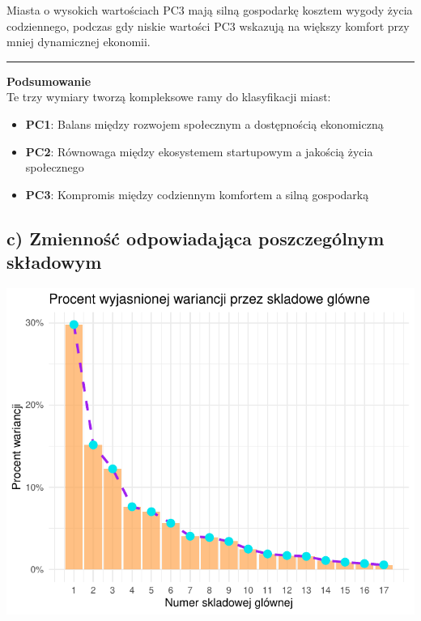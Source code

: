 \documentclass[
  12pt,
]{article}
\providecommand{\tightlist}{%
  \setlength{\itemsep}{0pt}\setlength{\parskip}{0pt}}
\begin{document}
Miasta o wysokich wartościach PC3 mają silną gospodarkę kosztem wygody
życia codziennego, podczas gdy niskie wartości PC3 wskazują na większy
komfort przy mniej dynamicznej ekonomii.

\begin{center}\rule{0.5\linewidth}{0.5pt}\end{center}

\textbf{Podsumowanie}\\
Te trzy wymiary tworzą kompleksowe ramy do klasyfikacji miast:

\begin{itemize}
\tightlist
\item
  \textbf{PC1}: Balans między rozwojem społecznym a dostępnością
  ekonomiczną\\
\item
  \textbf{PC2}: Równowaga między ekosystemem startupowym a jakością
  życia społecznego\\
\item
  \textbf{PC3}: Kompromis między codziennym komfortem a silną gospodarką
\end{itemize}

\subsection{c) Zmienność odpowiadająca poszczególnym
składowym}\label{c-zmiennoux15bux107-odpowiadajux105ca-poszczeguxf3lnym-skux142adowym}

\begin{center}\includegraphics{Sprawozdanie2_files/figure-latex/Zmiennosc_skladowych_w_PCA-1} \end{center}
\end{document}
